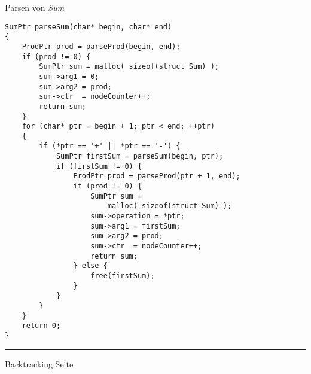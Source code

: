
\begin{slide}{}
\normalsize

\begin{center}
Parsen von \textsl{Sum}\end{center}
\vspace*{0.5cm}

\footnotesize
\begin{verbatim}
SumPtr parseSum(char* begin, char* end)
{
    ProdPtr prod = parseProd(begin, end);
    if (prod != 0) {
        SumPtr sum = malloc( sizeof(struct Sum) );
        sum->arg1 = 0;
        sum->arg2 = prod;
        sum->ctr  = nodeCounter++;
        return sum;
    }
    for (char* ptr = begin + 1; ptr < end; ++ptr) 
    {
        if (*ptr == '+' || *ptr == '-') {
            SumPtr firstSum = parseSum(begin, ptr);
            if (firstSum != 0) {
                ProdPtr prod = parseProd(ptr + 1, end);
                if (prod != 0) {
                    SumPtr sum = 
                        malloc( sizeof(struct Sum) );
                    sum->operation = *ptr;
                    sum->arg1 = firstSum;
                    sum->arg2 = prod;
                    sum->ctr  = nodeCounter++;
                    return sum;
                } else {
                    free(firstSum);
                }
            }
        }
    }
    return 0;
}
\end{verbatim}

\vspace*{\fill}
\tiny \addtocounter{mypage}{1}
\rule{17cm}{1mm}
Backtracking  \hspace*{\fill} Seite 
\end{slide}


